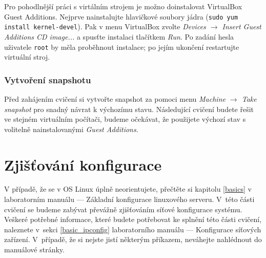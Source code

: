 Pro pohodlnější práci s virtálním strojem je možno doinstalovat VirtualBox Guest Additions.
Nejprve nainstalujte hlavičkové soubory jádra (\texttt{sudo yum install kernel-devel}).
Pak v menu VirtualBox zvolte \textit{Devices $\rightarrow$ Insert Guest Additions CD image...} a spusťte instalaci tlačítkem \textit{Run}.
Po zadání hesla uživatele \texttt{root} by měla proběhnout instalace; po jejím ukončení restartujte virtuální stroj.

\subsubsection*{Vytvoření snapshotu}
Před zahájením cvičení si vytvořte snapshot za pomoci menu \textit{Machine
$\rightarrow$ Take snapshot} pro snadný návrat k výchozímu stavu. Následující
cvičení budete řešit ve stejném virtuálním počítači, budeme očekávat, že
použijete výchozí stav s volitelně nainstalovanými \emph{Guest Additions}.

\section{Zjišťování konfigurace}
V případě, že se v OS Linux úplně neorientujete, přečtěte si kapitolu \ref{basics} v
laboratorním manuálu --- Základní konfigurace linuxového serveru. V~této části cvičení se
budeme zabývat převážně zjišťováním síťové konfigurace systému. Veškeré potřebné
informace, které budete potřebovat ke splnění této části cvičení, naleznete
v~sekci \ref{basic_ipconfig} laboratorního manuálu --- Konfigurace síťových zařízení. V~případě, že si nejste jistí některým příkazem, neváhejte nahlédnout do manuálové stránky.


